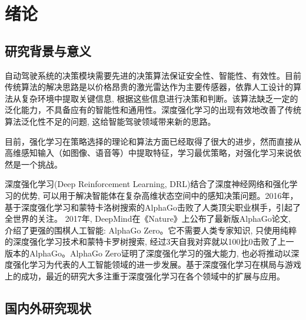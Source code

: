 %
%
%
%
%
%

\chapter{绪论}

\section{研究背景与意义}
自动驾驶系统的决策模块需要先进的决策算法保证安全性、智能性、有效性。目前传统算法的解决思路是以价格昂贵的激光雷达作为主要传感器，依靠人工设计的算法从复杂环境中提取关键信息, 根据这些信息进行决策和判断。该算法缺乏一定的泛化能力，不具备应有的智能性和通用性。深度强化学习的出现有效地改善了传统算法泛化性不足的问题, 这给智能驾驶领域带来新的思路。

目前，强化学习在策略选择的理论和算法方面已经取得了很大的进步，然而直接从高维感知输入（如图像、语音等）中提取特征，学习最优策略，对强化学习来说依然是一个挑战。

深度强化学习(Deep Reinforcement Learning, DRL)结合了深度神经网络和强化学习的优势, 可以用于解决智能体在复杂高维状态空间中的感知决策问题\cite{唐振韬2017深度强化学习进展}\cite{2017Deep}。2016年，基于深度强化学习和蒙特卡洛树搜索的AlphaGo击败了人类顶尖职业棋手，引起了全世界的关注\cite{2017Review}。 2017年, DeepMind在《Nature》上公布了最新版AlphaGo论文, 介绍了更强的围棋人工智能: AlphaGo Zero。它不需要人类专家知识, 只使用纯粹的深度强化学习技术和蒙特卡罗树搜索, 经过3天自我对弈就以100比0击败了上一版本的AlphaGo。AlphaGo Zero证明了深度强化学习的强大能力, 也必将推动以深度强化学习为代表的人工智能领域的进一步发展。基于深度强化学习在棋局与游戏上的成功，最近的研究大多注重于深度强化学习在各个领域中的扩展与应用。



\section{国内外研究现状}

